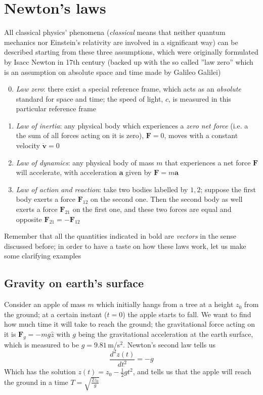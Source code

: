 \documentclass[11pt, a4paper,oneside,openright]{book}
\numberwithin{equation}{section}
\begin{document}
\section{Newton's laws}
All classical physics' phenomena (\textit{classical} means that neither quantum mechanics nor Einstein's relativity are involved in a significant way) can be described starting from these three assumptions, which were originally formulated by Isacc Newton in 17th century (backed up with the so called ''law zero'' which is an assumption on absolute space and time made by Galileo Galilei)
\begin{enumerate}
\setcounter{enumi}{-1}
\item \textit{Law zero}: there exist a special reference frame, which acts as an \textit{absolute} standard for space and time; the speed of light, $c$, is measured in this particular reference frame 
\item \textit{Law of inertia}: any physical body which experiences a \textit{zero net force} (i.e. a the sum of all forces acting on it is zero), $\mathbf{F}=0$, moves with a constant velocity $\dot{\mathbf{v}}=0$
\item \textit{Law of dynamics}: any physical body of mass $m$ that experiences a net force $\mathbf{F}$ will accelerate, with acceleration $\mathbf{a}$ given by $\mathbf{F}=m\mathbf{a}$
\item \textit{Law of action and reaction}: take two bodies labelled by $1,2$; suppose the first body exerts a force $\mathbf{F}_{12}$ on the second one. Then the second body as well exerts a force $\mathbf{F}_{21}$ on the first one, and these two forces are equal and opposite $\mathbf{F}_{21}=-\mathbf{F}_{12}$ 
\end{enumerate} 
Remember that all the quantities indicated in bold are \textit{vectors} in the sense discussed before; in order to have a taste on how these laws work, let us make some clarifying examples
\subsection{Gravity on earth's surface}
Consider an apple of mass $m$ which initially hangs from a tree at a height $z_0$ from the ground; at a certain instant ($t=0$) the apple starts to fall. We want to find how much time it will take to reach the ground; the gravitational force acting on it is $\mathbf{F}_g=-mg\hat{z}$ with $g$ being the gravitational acceleration at the earth surface, which is measured to be $g=9.81$\,m/s$^2$. Newton's second law tells us
\begin{equation}
\frac{d^2z(t)}{dt^2}=-g
\end{equation}
Which has the solution $z(t)=z_0-\frac{1}{2}gt^2$, and tells us that the apple will reach the ground in a time $T=\sqrt{\frac{2z_0}{g}}$
\end{document}
